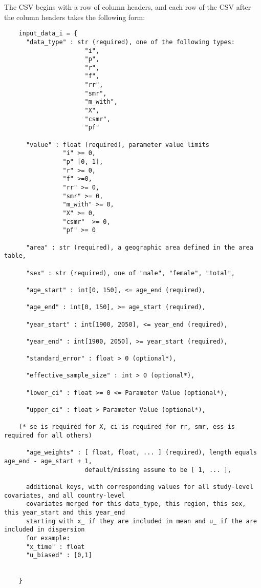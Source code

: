 The CSV begins with a row of column headers, and each row of the CSV after the column headers takes the following form:
\begin{verbatim}
    input_data_i = {
      "data_type" : str (required), one of the following types:
                      "i",
                      "p",
                      "r",
                      "f",
                      "rr",
                      "smr",
                      "m_with",
                      "X",
                      "csmr",
                      "pf"

      "value" : float (required), parameter value limits
                "i" >= 0,
                "p" [0, 1],
                "r" >= 0,
                "f" >=0,
                "rr" >= 0,
                "smr" >= 0,
                "m_with" >= 0,
                "X" >= 0,
                "csmr"  >= 0,
                "pf" >= 0

      "area" : str (required), a geographic area defined in the area table,

      "sex" : str (required), one of "male", "female", "total",

      "age_start" : int[0, 150], <= age_end (required),

      "age_end" : int[0, 150], >= age_start (required),

      "year_start" : int[1900, 2050], <= year_end (required),

      "year_end" : int[1900, 2050], >= year_start (required),

      "standard_error" : float > 0 (optional*),

      "effective_sample_size" : int > 0 (optional*),

      "lower_ci" : float >= 0 <= Parameter Value (optional*),
      
      "upper_ci" : float > Parameter Value (optional*),

    (* se is required for X, ci is required for rr, smr, ess is required for all others)

      "age_weights" : [ float, float, ... ] (required), length equals age_end - age_start + 1,
                      default/missing assume to be [ 1, ... ],

      additional keys, with corresponding values for all study-level covariates, and all country-level   
      covariates merged for this data_type, this region, this sex, this year_start and this year_end
      starting with x_ if they are included in mean and u_ if the are included in dispersion
      for example:
      "x_time" : float
      "u_biased" : [0,1]

      
    }
\end{verbatim}


